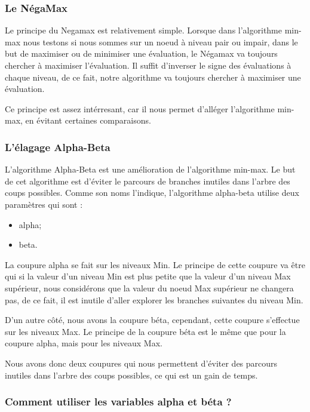 \documentclass[12pt]{article}
\begin{document}
\subsubsection{Le NégaMax}\label{le-nuxe9gamax}

Le principe du Negamax est relativement simple. Lorsque dans
l'algorithme min-max nous testons si nous sommes sur un noeud à niveau
pair ou impair, dans le but de maximiser ou de minimiser une évaluation,
le Négamax va toujours chercher à maximiser l'évaluation. Il suffit
d'inverser le signe des évaluations à chaque niveau, de ce fait, notre
algorithme va toujours chercher à maximiser une évaluation.

Ce principe est assez intérresant, car il nous permet d'alléger
l'algorithme min-max, en évitant certaines comparaisons.

\subsubsection{L'élagage Alpha-Beta}\label{luxe9lagage-alpha-beta}

L'algorithme Alpha-Beta est une amélioration de l'algorithme min-max. Le
but de cet algorithme est d'éviter le parcours de branches inutiles dans
l'arbre des coups possibles. Comme son noms l'indique, l'algorithme
alpha-beta utilise deux paramètres qui sont :

\begin{itemize}
\itemsep1pt\parskip0pt
\item
  alpha;
\item
  beta.
\end{itemize}

La coupure alpha se fait sur les niveaux Min. Le principe de cette
coupure va être qui si la valeur d'un niveau Min est plus petite que la
valeur d'un niveau Max supérieur, nous considérons que la valeur du
noeud Max supérieur ne changera pas, de ce fait, il est inutile d'aller
explorer les branches suivantes du niveau Min.

D'un autre côté, nous avons la coupure béta, cependant, cette coupure
s'effectue sur les niveaux Max. Le principe de la coupure béta est le
même que pour la coupure alpha, mais pour les niveaux Max.

Nous avons donc deux coupures qui nous permettent d'éviter des parcours
inutiles dans l'arbre des coups possibles, ce qui est un gain de temps.

\subsubsection{Comment utiliser les variables alpha et béta
?}\label{comment-utiliser-les-variables-alpha-et-buxe9ta}
\end{document}

